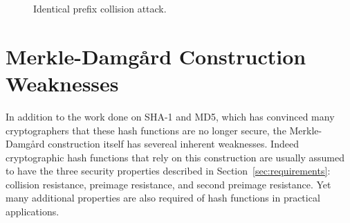 \begin{figure}[!ht]
        \caption{\label{fig:collision-attack}Identical prefix collision attack.}
\end{figure}


\section{Merkle-Damg\r{a}rd Construction Weaknesses}

In addition to the work done on SHA-1 and MD5, which has convinced many cryptographers that these hash functions are no longer secure, the Merkle-Damg\r{a}rd construction itself has severeal inherent weaknesses.
Indeed cryptographic hash functions that rely on this construction are usually assumed to have the three security properties described in Section~\ref{sec:requirements}: collision resistance, preimage resistance, and second preimage resistance. Yet many additional properties are also required of hash functions in practical applications.

